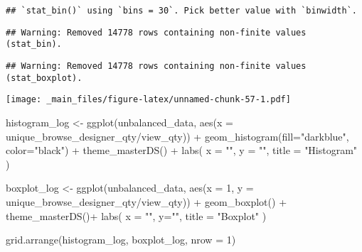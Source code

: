 \documentclass[
]{book}
\newenvironment{Shaded}{\begin{snugshade}}{\end{snugshade}}
\newcommand{\AttributeTok}[1]{\textcolor[rgb]{0.77,0.63,0.00}{#1}}
\newcommand{\DecValTok}[1]{\textcolor[rgb]{0.00,0.00,0.81}{#1}}
\newcommand{\FunctionTok}[1]{\textcolor[rgb]{0.00,0.00,0.00}{#1}}
\newcommand{\NormalTok}[1]{#1}
\newcommand{\OtherTok}[1]{\textcolor[rgb]{0.56,0.35,0.01}{#1}}
\newcommand{\SpecialCharTok}[1]{\textcolor[rgb]{0.00,0.00,0.00}{#1}}
\newcommand{\StringTok}[1]{\textcolor[rgb]{0.31,0.60,0.02}{#1}}
\begin{document}
\begin{verbatim}
## `stat_bin()` using `bins = 30`. Pick better value with `binwidth`.
\end{verbatim}

\begin{verbatim}
## Warning: Removed 14778 rows containing non-finite values (stat_bin).
\end{verbatim}

\begin{verbatim}
## Warning: Removed 14778 rows containing non-finite values (stat_boxplot).
\end{verbatim}

\texttt{[image: \_main\_files/figure-latex/unnamed-chunk-57-1.pdf]}

\begin{Shaded}
\begin{Highlighting}[]
\NormalTok{ histogram\_log }\OtherTok{\textless{}{-}} \FunctionTok{ggplot}\NormalTok{(unbalanced\_data, }\FunctionTok{aes}\NormalTok{(}\AttributeTok{x =}\NormalTok{ unique\_browse\_designer\_qty}\SpecialCharTok{/}\NormalTok{view\_qty)) }\SpecialCharTok{+}
    \FunctionTok{geom\_histogram}\NormalTok{(}\AttributeTok{fill=}\StringTok{"darkblue"}\NormalTok{, }\AttributeTok{color=}\StringTok{"black"}\NormalTok{) }\SpecialCharTok{+}
    \FunctionTok{theme\_masterDS}\NormalTok{() }\SpecialCharTok{+}
    \FunctionTok{labs}\NormalTok{(}
      \AttributeTok{x =} \StringTok{""}\NormalTok{,}
      \AttributeTok{y =} \StringTok{""}\NormalTok{,}
      \AttributeTok{title =} \StringTok{"Histogram"}
\NormalTok{    )}
  
\NormalTok{  boxplot\_log }\OtherTok{\textless{}{-}} \FunctionTok{ggplot}\NormalTok{(unbalanced\_data, }\FunctionTok{aes}\NormalTok{(}\AttributeTok{x =} \DecValTok{1}\NormalTok{, }\AttributeTok{y =}\NormalTok{ unique\_browse\_designer\_qty}\SpecialCharTok{/}\NormalTok{view\_qty)) }\SpecialCharTok{+}
    \FunctionTok{geom\_boxplot}\NormalTok{() }\SpecialCharTok{+}
    \FunctionTok{theme\_masterDS}\NormalTok{()}\SpecialCharTok{+}
    \FunctionTok{labs}\NormalTok{(}
      \AttributeTok{x =} \StringTok{""}\NormalTok{,}
      \AttributeTok{y=}\StringTok{""}\NormalTok{,}
      \AttributeTok{title =} \StringTok{"Boxplot"}
\NormalTok{    )}

  \FunctionTok{grid.arrange}\NormalTok{(histogram\_log, boxplot\_log, }\AttributeTok{nrow =} \DecValTok{1}\NormalTok{)}
\end{Highlighting}
\end{Shaded}
\end{document}
